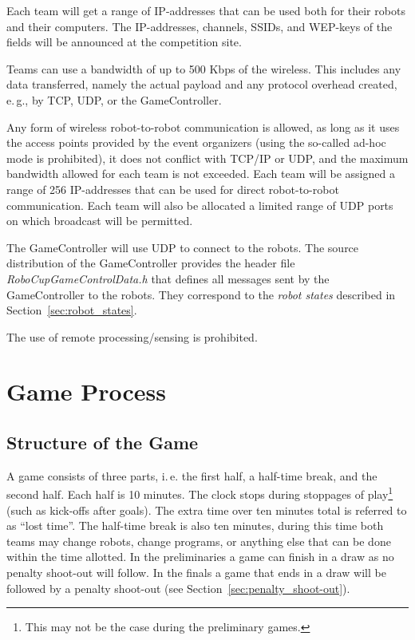 \documentclass[12pt]{article}
\newcommand{\ie}{\mbox{i.\,e.}\xspace}
\newcommand{\eg}{\mbox{e.\,g.}\xspace}
\begin{document}
Each team will get a range of IP-addresses that can be used both for
their robots and their computers. The IP-addresses, channels, SSIDs,
and WEP-keys of the fields will be announced at the competition
site.

Teams can use a bandwidth of up to 500 Kbps of the wireless. This
includes any data transferred, namely the actual payload and any
protocol overhead created, \eg, by TCP, UDP, or the GameController.

Any form of wireless robot-to-robot communication is allowed, as
long as it uses the access points provided by the event organizers
(using the so-called ad-hoc mode is prohibited), it does not
conflict with TCP/IP or UDP, and the maximum bandwidth allowed for
each team is not exceeded. Each team will be assigned a range of 256
IP-addresses that can be used for direct robot-to-robot
communication. Each team will also be allocated a limited range of
UDP ports on which broadcast will be permitted.

The GameController will use UDP to connect to the robots. The source
distribution of the GameController provides the header file
\emph{RoboCupGameControlData.h} that defines all messages sent by
the GameController to the robots. They correspond to the \emph{robot
states} described in Section~\ref{sec:robot_states}.

The use of remote processing/sensing is prohibited.

\section{Game Process}
\subsection{Structure of the Game}

\label{sec:game_struct}

A game consists of three parts, \ie the first half, a half-time
break, and the second half. Each half is 10 minutes. The clock stops
during stoppages of play\footnote{This may not be the case during
the preliminary games.} (such as kick-offs after goals). The extra
time over ten minutes total is referred to as ``lost time''.  The
half-time break is also ten minutes, during this time both teams may
change robots, change programs, or anything else that
can be done within the time allotted.  In the preliminaries a game
can finish in a draw as no penalty shoot-out will follow.
In the finals a game that ends in a draw will be followed by
a penalty shoot-out (see Section~\ref{sec:penalty_shoot-out}).
\end{document}
